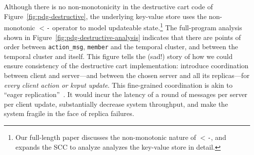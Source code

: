 

Although there is no
non-monotonicity in the destructive
cart code of Figure~\ref{fig:pdg-destructive}, the underlying key-value store uses the non-monotonic \texttt{$<$-} operator to model updateable state.\footnote{Our full-length paper discusses the non-monotonic nature of \texttt{$<$-}, and
expands the SCC to analyze analyzes the key-value store in detail.}
The full-program analysis shown in Figure~\ref{fig:pdg-destructive-analysis}
indicates that there are
points of order between \texttt{action\_msg}, \texttt{member} and the temporal cluster,
and between the temporal cluster and itself.
This figure tells the (sad!) story of how we could ensure consistency of the destructive cart implementation: introduce coordination
between client and server---and between the chosen server and all its replicas---for {\em every client action or kvput update}.  This fine-grained coordination is akin to ``eager replication''~\cite{dangers}. It would incur the latency of a round of messages per server per client update, substantially decrease system throughput, and make the system fragile in the face of replica failures.

